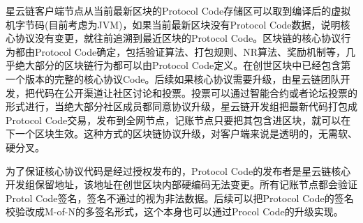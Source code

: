 星云链客户端节点从当前最新区块的Protocol Code存储区可以取到编译后的虚拟机字节码(目前考虑为JVM)，如果当前最新区块没有Protocol Code数据，说明核心协议没有变更，就往前追溯到最近区块的Protocol Code。区块链的核心协议行为都由Protocol Code确定，包括验证算法、打包规则、NR算法、奖励机制等，几乎绝大部分的区块链行为都可以由Protocol Code定义。在创世区块中已经包含第一个版本的完整的核心协议Code。后续如果核心协议需要升级，由星云链团队开发，把代码在公开渠道让社区讨论和投票。投票可以通过智能合约或者论坛投票的形式进行，当绝大部分社区成员都同意协议升级，星云链开发组把最新代码打包成Protocol Code交易，发布到全网节点，记账节点只要把其包含进区块，就可以在下一个区块生效。这种方式的区块链协议升级，对客户端来说是透明的，无需软、硬分叉。

为了保证核心协议代码是经过授权发布的，Protocol Code的发布者是星云链核心开发组保留地址，该地址在创世区块内部硬编码无法变更。所有记账节点都会验证Protol Code签名，签名不通过的视为非法数据。后续可以把Protocol Code的签名校验改成M-of-N的多签名形式，这个本身也可以通过Procol Code的升级实现。